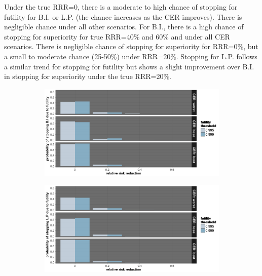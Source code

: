 \documentclass[]{article}
\begin{document}
Under the true RRR=0, there is a moderate to high chance of stopping for
futility for B.I. or L.P. (the chance increases as the CER improves).
There is negligible chance under all other scenarios. For B.I., there is
a high chance of stopping for superiority for true RRR=40\% and 60\% and
under all CER scenarios. There is negligible chance of stopping for
superiority for RRR=0\%, but a small to moderate chance (25-50\%) under
RRR=20\%. Stopping for L.P. follows a similar trend for stopping for
futility but shows a slight improvement over B.I. in stopping for
superiority under the true RRR=20\%.

\begin{figure}
\centering
  \caption{Probability of stopping (a) B.I. or (b) L.P. due to futility.  Stopping probabilities are presented for the
  three control event rates (CER – rows), four relative risk reductions (RRR – columns), and two superiority thresholds for B.I. (legend). Note that the legend and x axis labels should reflect the description given above, not as labeled on the graphic.}
  \begin{subfigure}{0.8\textwidth}
    \centering
    \caption{}
    \includegraphics{../plots/3arm/futbi_3arm.png}
  \end{subfigure}
  \bigbreak
  \begin{subfigure}{0.8\textwidth}
    \centering
    \caption{}
    \includegraphics{../plots/3arm/futlp_3arm.png}
  \end{subfigure}
\end{figure}
\end{document}
